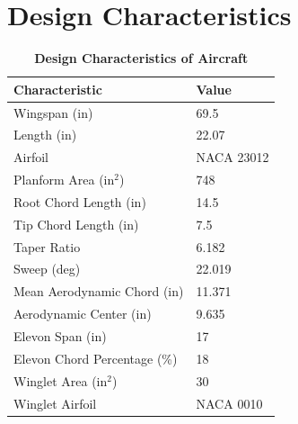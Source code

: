 \section{Design Characteristics}

    \begin{table}[H]
    \begin{center}
    \caption{\textbf{Design Characteristics of Aircraft}} \label{table:design_char}
    \begin{tabular}{|p{2.5in}|p{1.4in}|} 
        \hline
        \textbf{Characteristic} & \textbf{Value} \\ \hline
        Wingspan (in) & 69.5 \\ \hline
        Length (in) & 22.07 \\ \hline
        Airfoil & NACA 23012 \\ \hline
        Planform Area (in$^2$) & 748 \\ \hline
        Root Chord Length (in) & 14.5 \\ \hline
        Tip Chord Length (in) & 7.5 \\ \hline
        Taper Ratio & 6.182 \\ \hline
        Sweep (deg) & 22.019 \\ \hline
        Mean Aerodynamic Chord (in) &  11.371 \\ \hline
        Aerodynamic Center (in) & 9.635 \\ \hline
        Elevon Span (in) & 17 \\ \hline
        Elevon Chord Percentage (\%) & 18 \\ \hline
        Winglet Area (in$^2$) & 30 \\ \hline
        Winglet Airfoil & NACA 0010 \\
        \hline
    \end{tabular}
    \end{center}
    \end{table}

